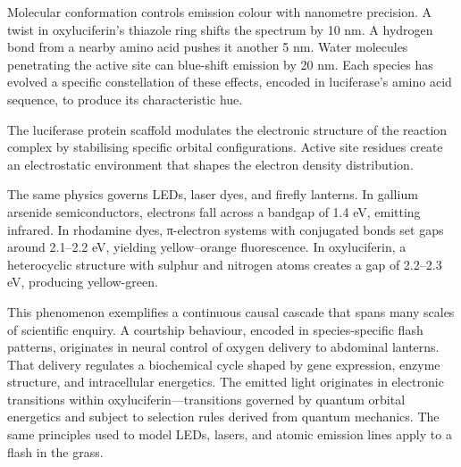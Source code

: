 Molecular conformation controls emission colour with nanometre precision. A twist in oxyluciferin's thiazole ring shifts the spectrum by 10 nm. A hydrogen bond from a nearby amino acid pushes it another 5 nm. Water molecules penetrating the active site can blue-shift emission by 20 nm. Each species has evolved a specific constellation of these effects, encoded in luciferase's amino acid sequence, to produce its characteristic hue.

The luciferase protein scaffold modulates the electronic structure of the reaction complex by stabilising specific orbital configurations. Active site residues create an electrostatic environment that shapes the electron density distribution. 

The same physics governs LEDs, laser dyes, and firefly lanterns. In gallium arsenide semiconductors, electrons fall across a bandgap of 1.4 eV, emitting infrared. In rhodamine dyes, π-electron systems with conjugated bonds set gaps around 2.1–2.2 eV, yielding yellow–orange fluorescence. In oxyluciferin, a heterocyclic structure with sulphur and nitrogen atoms creates a gap of 2.2–2.3 eV, producing yellow-green.

This phenomenon exemplifies a continuous causal cascade that spans many scales of scientific enquiry. A courtship behaviour, encoded in species-specific flash patterns, originates in neural control of oxygen delivery to abdominal lanterns. That delivery regulates a biochemical cycle shaped by gene expression, enzyme structure, and intracellular energetics. The emitted light originates in electronic transitions within oxyluciferin—transitions governed by quantum orbital energetics and subject to selection rules derived from quantum mechanics. The same principles used to model LEDs, lasers, and atomic emission lines apply to a flash in the grass.

